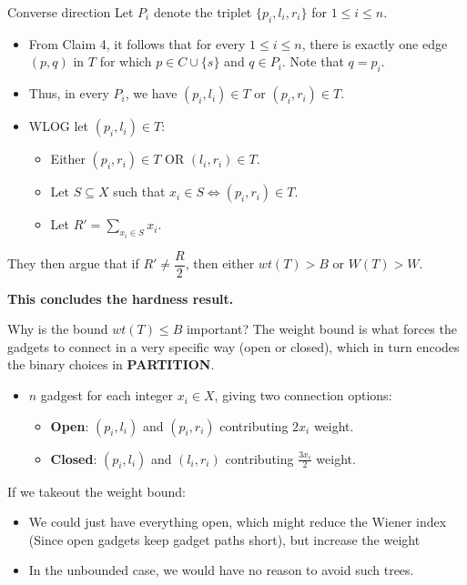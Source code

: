 \documentclass[11pt]{beamer}
\begin{document}
\begin{frame}{Converse direction}
	Let $P_i$ denote the triplet $\{p_i, l_i, r_i\}$ for $1 \leq i \leq n$.
	\begin{itemize}
		\item From Claim 4, it follows that for every $1 \leq i \leq n$, there is exactly one edge $(p, q)$ in $T$ for which $p \in C \cup \{s\}$ and $q \in P_i$. Note that $q = p_i$.
		\item Thus, in every $P_i$, we have $(p_i, l_i) \in T$ or $(p_i, r_i) \in T$.
		\item WLOG let $(p_i, l_i) \in T$:
		      \begin{itemize}
			      \item Either $(p_i, r_i) \in T$ OR $(l_i, r_i) \in T$.
			      \item Let $S \subseteq X$ such that $x_i \in S \iff (p_i, r_i) \in T$.
			      \item Let $R' = \displaystyle\sum_{x_i \in S}x_i$.
		      \end{itemize}
	\end{itemize}

	They then argue that if $R' \neq \dfrac{R}{2}$, then either $wt(T) > B$ or $W(T) > W$.

	\vspace{0.5em}

	\begin{center}
		\textbf{This concludes the hardness result.}
	\end{center}
\end{frame}

\begin{frame}{Why is the bound $wt(T) \leq B$ important?}
	The weight bound is what forces the gadgets to connect in a very specific way (open or closed), which in turn encodes the binary choices in \textbf{PARTITION}.

	\begin{itemize}
		\item $n$ gadgest for each integer $x_i \in X$, giving two connection options:
		      \begin{itemize}
			      \item \textbf{Open}: $(p_i, l_i)$ and $(p_i, r_i)$ contributing $2x_i$ weight.
			      \item \textbf{Closed}: $(p_i, l_i)$ and $(l_i, r_i)$ contributing $\frac{3x_i}{2}$ weight.
		      \end{itemize}
	\end{itemize}

	If we takeout the weight bound:
	\begin{itemize}
		\item We could just have everything open, which might reduce the Wiener index (Since open gadgets keep gadget paths short), but increase the weight
		\item In the unbounded case, we would have no reason to avoid such trees.
	\end{itemize}
\end{frame}
\end{document}
